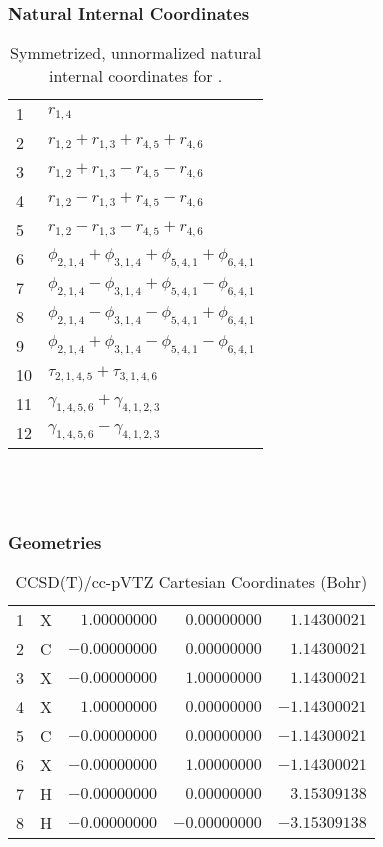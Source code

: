 \documentclass[10pt,oneside]{article}
\begin{document}
\subsubsection*{Natural Internal Coordinates}
\begin{table}[h!]
\centering
\caption{Symmetrized, unnormalized natural internal coordinates for .}
\small
\begin{tabular}{ll}
  1   & $r_{1,4}$ \\
  2   & $r_{1,2} + r_{1,3} + r_{4,5} + r_{4,6}$ \\
  3   & $r_{1,2} + r_{1,3} - r_{4,5} - r_{4,6}$ \\
  4   & $r_{1,2} - r_{1,3} + r_{4,5} - r_{4,6}$ \\
  5   & $r_{1,2} - r_{1,3} - r_{4,5} + r_{4,6}$ \\
  6   & $\phi_{2,1,4} + \phi_{3,1,4} + \phi_{5,4,1} + \phi_{6,4,1}$ \\
  7   & $\phi_{2,1,4} - \phi_{3,1,4} + \phi_{5,4,1} - \phi_{6,4,1}$ \\
  8   & $\phi_{2,1,4} - \phi_{3,1,4} - \phi_{5,4,1} + \phi_{6,4,1}$ \\
  9   & $\phi_{2,1,4} + \phi_{3,1,4} - \phi_{5,4,1} - \phi_{6,4,1}$ \\
  10  & $\tau_{2,1,4,5} + \tau_{3,1,4,6}$ \\
  11  & $\gamma_{1,4,5,6} + \gamma_{4,1,2,3}$ \\
  12  & $\gamma_{1,4,5,6} - \gamma_{4,1,2,3}$ \\
\end{tabular}
\end{table}

\clearpage

\subsection{\ \ \ }

\subsubsection*{Geometries}
\begin{table}[h!]
\centering
\caption{CCSD(T)/cc-pVTZ Cartesian Coordinates (Bohr)}
\begin{tabular}{llrrr}
1  & X  & $ 1.00000000$ & $ 0.00000000$ & $ 1.14300021$ \\
2  & C  & $-0.00000000$ & $ 0.00000000$ & $ 1.14300021$ \\
3  & X  & $-0.00000000$ & $ 1.00000000$ & $ 1.14300021$ \\
4  & X  & $ 1.00000000$ & $ 0.00000000$ & $-1.14300021$ \\
5  & C  & $-0.00000000$ & $ 0.00000000$ & $-1.14300021$ \\
6  & X  & $-0.00000000$ & $ 1.00000000$ & $-1.14300021$ \\
7  & H  & $-0.00000000$ & $ 0.00000000$ & $ 3.15309138$ \\
8  & H  & $-0.00000000$ & $-0.00000000$ & $-3.15309138$ \\
\end{tabular}
\end{table}
\end{document}
